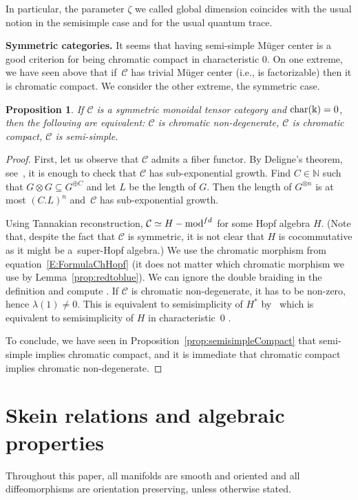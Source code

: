 \documentclass[10pt,a4paper]{amsart}
\newtheorem{proposition}{Proposition}
\numberwithin{equation}{section}
\numberwithin{theorem}{section}
\numberwithin{proposition}{section}
\numberwithin{definition}{section}
\numberwithin{lemma}{section}
\numberwithin{corollary}{section}
\numberwithin{remark}{section}
\numberwithin{example}{section}
\newcommand{\cat}{\mathcal{C}}
\newcommand{\FK}{{\Bbbk}}
\begin{document}
In particular, the parameter $\zeta$ we called global dimension coincides with the usual notion in the semisimple case and for the usual quantum trace.

{\bf Symmetric categories.} It seems that having semi-simple M\"uger center is a good criterion for being chromatic compact in characteristic 0. On one extreme, we have seen above that if~$\cat$ has trivial M\"uger center (i.e., is factorizable) then it is chromatic compact. We consider the other extreme, the symmetric case. %
\begin{proposition}\label{P:symcase}
If $\cat$ is a symmetric monoidal tensor category and ${\rm char}(\FK)=0$, then the following are equivalent: $\cat$ is chromatic non-degenerate, $\cat$ is chromatic compact, $\cat$ is semi-simple.
\end{proposition}
\begin{proof}
First, let us observe that $\cat$ admits a fiber functor. By Deligne's theorem, see~\cite[Theorem~9.11.4]{EGNO}, it is enough to check that $\cat$ has sub-exponential growth. Find $C\in \mathbb{N}$ such that $G\otimes G \subseteq G^{\oplus C}$ and let $L$ be the length of $G$. Then the length of $G^{\otimes n}$ is at most $(C.L)^n$ and~$\cat$ has sub-exponential growth.

Using Tannakian reconstruction, $\cat \simeq H-{\rm mod}^{fd}$ for some Hopf algebra $H$. (Note that, despite the fact that $\cat$ is symmetric, it is not clear that $H$ is cocommutative as it might be a~super-Hopf algebra.)
We use the chromatic morphism from equation~\ref{E:FormulaChHopf} (it does not matter which chromatic morphism we use by Lemma~\ref{prop:redtoblue}). We can ignore the double braiding in the definition and compute . If $\cat$ is chromatic non-degenerate, it has to be non-zero, hence $\lambda(1) \neq0$. This is equivalent to semisimplicity of $H^*$ by~\cite{Radford} which is equivalent to semisimplicity of $H$ in characteristic~0 \cite{RadfordLarson}.

 To conclude, we have seen in Proposition~\ref{prop:semisimpleCompact} that semi-simple implies chromatic compact, and it is immediate that chromatic compact implies chromatic non-degenerate.
\end{proof}


\section{Skein relations and algebraic properties}
Throughout this paper, all manifolds are smooth and oriented and all
diffeomorphisms are orientation preserving, unless otherwise stated.
\end{document}
